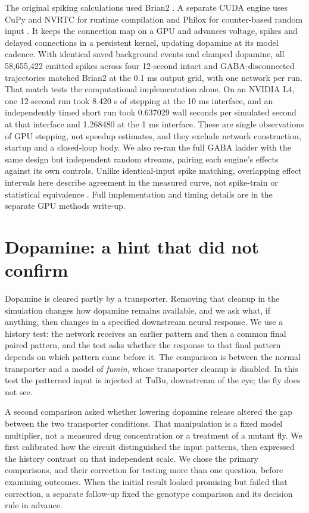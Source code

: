 \documentclass[11pt]{article}
\begin{document}
The original spiking calculations used Brian2 \cite{stimberg}. A separate CUDA engine uses CuPy and NVRTC for runtime compilation and Philox for counter-based random input \cite{okuta,nvrtc,salmon}. It keeps the connection map on a GPU and advances voltage, spikes and delayed connections in a persistent kernel, updating dopamine at its model cadence. With identical saved background events and clamped dopamine, all 58,655,422 emitted spikes across four 12-second intact and GABA-disconnected trajectories matched Brian2 at the 0.1 ms output grid, with one network per run. That match tests the computational implementation alone. On an NVIDIA L4, one 12-second run took 8.420 s of stepping at the 10 ms interface, and an independently timed short run took 0.637029 wall seconds per simulated second at that interface and 1.268480 at the 1 ms interface. These are single observations of GPU stepping, not speedup estimates, and they exclude network construction, startup and a closed-loop body. We also re-ran the full GABA ladder with the same design but independent random streams, pairing each engine's effects against its own controls. Unlike identical-input spike matching, overlapping effect intervals here describe agreement in the measured curve, not spike-train or statistical equivalence \cite{alevi,knight}. Full implementation and timing details are in the separate GPU methods write-up.

\section*{Dopamine: a hint that did not confirm}
Dopamine is cleared partly by a transporter. Removing that cleanup in the simulation changes how dopamine remains available, and we ask what, if anything, then changes in a specified downstream neural response. We use a history test: the network receives an earlier pattern and then a common final paired pattern, and the test asks whether the response to that final pattern depends on which pattern came before it. The comparison is between the normal transporter and a model of \textit{fumin}, whose transporter cleanup is disabled. In this test the patterned input is injected at TuBu, downstream of the eye; the fly does not see.

A second comparison asked whether lowering dopamine release altered the gap between the two transporter conditions. That manipulation is a fixed model multiplier, not a measured drug concentration or a treatment of a mutant fly. We first calibrated how the circuit distinguished the input patterns, then expressed the history contrast on that independent scale. We chose the primary comparisons, and their correction for testing more than one question, before examining outcomes. When the initial result looked promising but failed that correction, a separate follow-up fixed the genotype comparison and its decision rule in advance.
\end{document}
